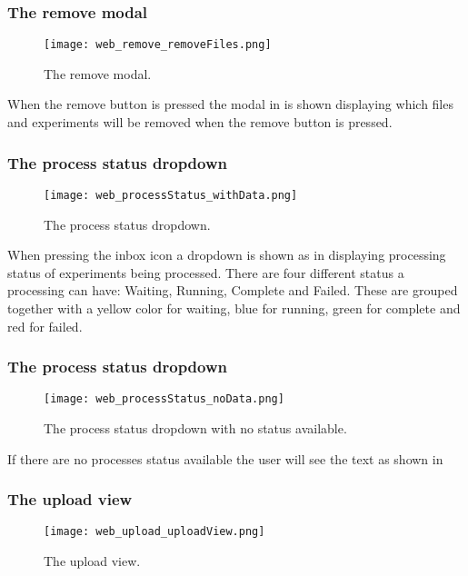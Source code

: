 \subsubsection{The remove modal}
\begin{figure}[h]
\centering
\texttt{[image: web\_remove\_removeFiles.png]}
\caption{\label{fig:web_remove_removeFiles}The remove modal.}
\end{figure}
\FloatBarrier
When the remove button is pressed the modal in  is shown displaying which files and experiments will be removed when the remove button is pressed.

\subsubsection{The process status dropdown}
\begin{figure}[h]
\centering
\texttt{[image: web\_processStatus\_withData.png]}
\caption{\label{fig:web_processStatus_withData}The process status dropdown.}
\end{figure}
\FloatBarrier
When pressing the inbox icon a dropdown is shown as in displaying processing status of experiments being processed.
There are four different status a processing can have: Waiting, Running, Complete and Failed.
These are grouped together with a yellow color for waiting, blue for running, green for complete and red for failed.
\subsubsection{The process status dropdown}
\begin{figure}[h]
\centering
\texttt{[image: web\_processStatus\_noData.png]}
\caption{\label{fig:web_processStatus_noData}The process status dropdown with no status available.}
\end{figure}
\FloatBarrier

If there are no processes status available the user will see the text as shown in 

\subsubsection{The upload view}
\begin{figure}[h]
\centering
\texttt{[image: web\_upload\_uploadView.png]}
\caption{\label{fig:web_upload_uploadView}The upload view.}
\end{figure}

